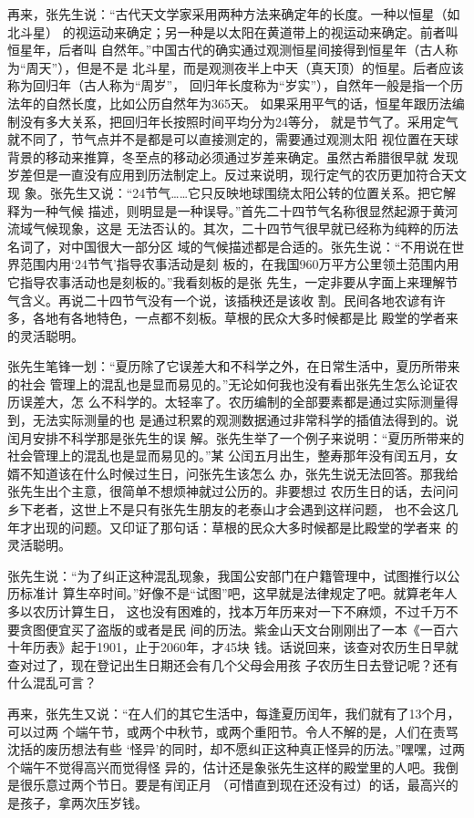 再来，张先生说：“古代天文学家采用两种方法来确定年的长度。一种以恒星（如北斗星）
的视运动来确定；另一种是以太阳在黄道带上的视运动来确定。前者叫恒星年，后者叫
自然年。”中国古代的确实通过观测恒星间接得到恒星年（古人称为“周天”），但是不是
北斗星，而是观测夜半上中天（真天顶）的恒星。后者应该称为回归年（古人称为“周岁”，
回归年长度称为“岁实”），自然年一般是指一个历法年的自然长度，比如公历自然年为365天。
如果采用平气的话，恒星年跟历法编制没有多大关系，把回归年长按照时间平均分为24等分，
就是节气了。采用定气就不同了，节气点并不是都是可以直接测定的，需要通过观测太阳
视位置在天球背景的移动来推算，冬至点的移动必须通过岁差来确定。虽然古希腊很早就
发现岁差但是一直没有应用到历法制定上。反过来说明，现行定气的农历更加符合天文现
象。张先生又说：“24节气……它只反映地球围绕太阳公转的位置关系。把它解释为一种气候
描述，则明显是一种误导。”首先二十四节气名称很显然起源于黄河流域气候现象，这是
无法否认的。其次，二十四节气很早就已经称为纯粹的历法名词了，对中国很大一部分区
域的气候描述都是合适的。张先生说：“不用说在世界范围内用‘24节气’指导农事活动是刻
板的，在我国960万平方公里领土范围内用它指导农事活动也是刻板的。”我看刻板的是张
先生，一定非要从字面上来理解节气含义。再说二十四节气没有一个说，该插秧还是该收
割。民间各地农谚有许多，各地有各地特色，一点都不刻板。草根的民众大多时候都是比
殿堂的学者来的灵活聪明。

张先生笔锋一划：“夏历除了它误差大和不科学之外，在日常生活中，夏历所带来的社会
管理上的混乱也是显而易见的。”无论如何我也没有看出张先生怎么论证农历误差大，怎
么不科学的。太轻率了。农历编制的全部要素都是通过实际测量得到，无法实际测量的也
是通过积累的观测数据通过非常科学的插值法得到的。说闰月安排不科学那是张先生的误
解。张先生举了一个例子来说明：“夏历所带来的社会管理上的混乱也是显而易见的。”某
公闰五月出生，整寿那年没有闰五月，女婿不知道该在什么时候过生日，问张先生该怎么
办，张先生说无法回答。那我给张先生出个主意，很简单不想烦神就过公历的。非要想过
农历生日的话，去问问乡下老者，这世上不是只有张先生朋友的老泰山才会遇到这样问题，
也不会这几年才出现的问题。又印证了那句话：草根的民众大多时候都是比殿堂的学者来
的灵活聪明。

张先生说：“为了纠正这种混乱现象，我国公安部门在户籍管理中，试图推行以公历标准计
算生卒时间。”好像不是“试图”吧，这早就是法律规定了吧。就算老年人多以农历计算生日，
这也没有困难的，找本万年历来对一下不麻烦，不过千万不要贪图便宜买了盗版的或者是民
间的历法。紫金山天文台刚刚出了一本《一百六十年历表》起于1901，止于2060年，才45块
钱。话说回来，该查对农历生日早就查对过了，现在登记出生日期还会有几个父母会用孩
子农历生日去登记呢？还有什么混乱可言？

再来，张先生又说：“在人们的其它生活中，每逢夏历闰年，我们就有了13个月，可以过两
个端午节，或两个中秋节，或两个重阳节。令人不解的是，人们在责骂沈括的废历想法有些
‘怪异’的同时，却不愿纠正这种真正怪异的历法。”嘿嘿，过两个端午不觉得高兴而觉得怪
异的，估计还是象张先生这样的殿堂里的人吧。我倒是很乐意过两个节日。要是有闰正月
（可惜直到现在还没有过）的话，最高兴的是孩子，拿两次压岁钱。

